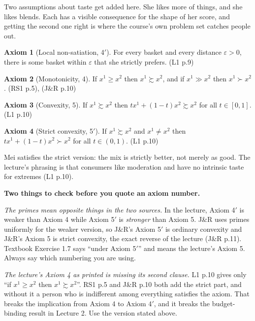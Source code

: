 \documentclass[11pt,letterpaper]{article}
\theoremstyle{definition}
\newtheorem{axiom}{Axiom}
\theoremstyle{plain}
\newcommand{\src}[1]{{\small\textsf{(#1)}}}
\newcommand{\wpref}{\succsim}
\newcommand{\spref}{\succ}
\begin{document}
Two assumptions about taste get added here. She likes more of things, and she likes blends. Each has
a visible consequence for the shape of her score, and getting the second one right is where the
course's own problem set catches people out.

\begin{axiom}[Local non-satiation, 4$'$] For every basket and every distance $\varepsilon > 0$,
there is some basket within $\varepsilon$ that she strictly prefers. \src{L1 p.9}
\end{axiom}

\begin{axiom}[Monotonicity, 4] If $x^1 \ge x^2$ then $x^1 \wpref x^2$, and if $x^1 \gg x^2$ then
$x^1 \spref x^2$. \src{RS1 p.5}, \src{J\&R p.10}
\end{axiom}

\begin{axiom}[Convexity, 5] If $x^1 \wpref x^2$ then $t x^1 + (1-t)x^2 \wpref x^2$ for all
$t \in [0,1]$. \src{L1 p.10}
\end{axiom}

\begin{axiom}[Strict convexity, 5$'$] If $x^1 \wpref x^2$ and $x^1 \ne x^2$ then
$t x^1 + (1-t)x^2 \spref x^2$ for all $t \in (0,1)$. \src{L1 p.10}
\end{axiom}

Mei satisfies the strict version: the mix is strictly better, not merely as good. The lecture's
phrasing is that consumers like moderation and have no intrinsic taste for extremes \src{L1 p.10}.

\begin{snugshade}
\noindent\textbf{Two things to check before you quote an axiom number.}

\emph{The primes mean opposite things in the two sources.} In the lecture, Axiom 4$'$ is weaker than
Axiom 4 while Axiom 5$'$ is \emph{stronger} than Axiom 5. J\&R uses primes uniformly for the weaker
version, so J\&R's Axiom 5$'$ is ordinary convexity and J\&R's Axiom 5 is strict convexity, the exact
reverse of the lecture \src{J\&R p.11}. Textbook Exercise 1.7 says ``under Axiom 5$'$'' and means
the lecture's Axiom 5. Always say which numbering you are using.

\emph{The lecture's Axiom 4 as printed is missing its second clause.} L1 p.10 gives only ``if
$x^1 \ge x^2$ then $x^1 \wpref x^2$''. RS1 p.5 and J\&R p.10 both add the strict part, and without
it a person who is indifferent among everything satisfies the axiom. That breaks the implication
from Axiom 4 to Axiom 4$'$, and it breaks the budget-binding result in Lecture 2. Use the version
stated above.
\end{snugshade}
\end{document}
